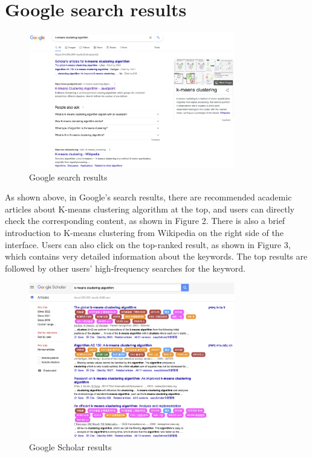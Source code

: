 \documentclass{article}
\begin{document}
    \section{Google search results}
    \begin{figure}[ht]
        \centering
        \includegraphics[width=0.8\textwidth]{Google_home.png}
        \caption{Google search results}
    \end{figure}
    As shown above, in Google's search results, there are recommended academic articles about K-means clustering algorithm at the top, and users can directly check the corresponding content, as shown in Figure 2. There is also a brief introduction to K-means clustering from Wikipedia on the right side of the interface. Users can also click on the top-ranked result, as shown in Figure 3, which contains very detailed information about the keywords. The top results are followed by other users' high-frequency searches for the keyword.
    \begin{figure}[ht]
        \centering
        \includegraphics[width=0.8\textwidth]{googleScholar.png}
        \caption{Google Scholar results}
    \end{figure}
\end{document}
